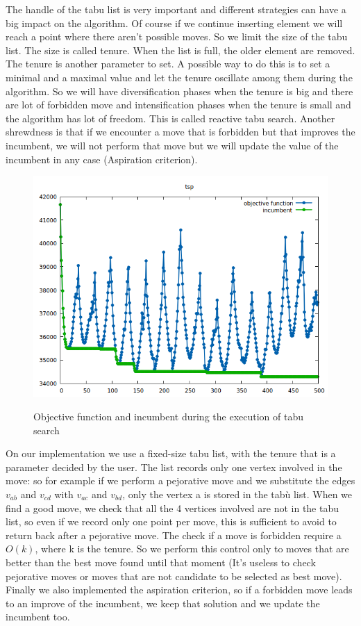 \noindent The handle of the tabu list is very important and different strategies can have a big impact on the algorithm. Of course if we continue inserting element we will reach a point where there aren't possible moves. So we limit the size of the tabu list. The size is called tenure. When the list is full, the older element are removed.
The tenure is another parameter to set. A possible way to do this is to set a minimal and a maximal value and let the tenure oscillate among them during the algorithm. So we will have diversification phases when the tenure is big and there are lot of forbidden move and intensification phases when the tenure is small and the algorithm has lot of freedom. This is called reactive tabu search.
Another shrewdness is that if we encounter a move that is forbidden but that improves the incumbent, we will not perform that move but we will update the value of the incumbent in any case (Aspiration criterion).\\

\begin{figure}[h!]
\centering
	\includegraphics[scale=0.6]{media/tabuSearch1.png} \\
	\caption{Objective function and incumbent during the execution of tabu search}
\end{figure}

\noindent On our implementation we use a fixed-size tabu list, with the tenure that is a parameter decided by the user. The list records only one vertex involved in the move: so for example if we perform a pejorative move and we substitute the edges $v_{ab}$ and $v_{cd}$ with $v_{ac}$ and $v_{bd}$, only the vertex a is stored in the tabù list. When we find a good move, we check that all the 4 vertices involved are not in the tabu list, so even if we record only one point per move, this is sufficient to avoid to return back after a pejorative move. 
The check if a move is forbidden require a $O(k)$, where k is the tenure. So we perform this control only to moves that are better than the best move found until that moment (It's useless to check pejorative moves or moves that are not candidate to be selected as best move). \\
Finally we also implemented the aspiration criterion, so if a forbidden move leads to an improve of the incumbent, we keep that solution and we update the incumbent too.



